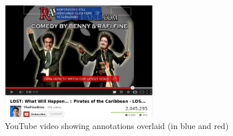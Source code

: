 	\begin{figure}[htb]
		\centering
			\includegraphics[width=0.6\textwidth]{images/youtube_annotations.png}
		\caption{YouTube video showing annotations overlaid (in blue and red)}
		\label{fig:youtube_annotation}
	\end{figure}





